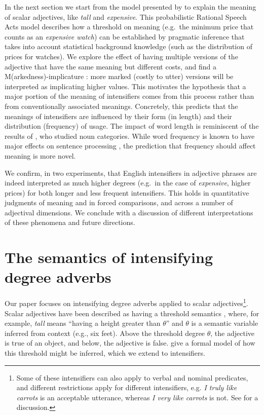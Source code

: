 \documentclass[10pt,letterpaper]{article}
\newcommand{\w}[1]{\emph{#1}}
\begin{document}
In the next section we start from the model presented by  to explain the meaning of scalar adjectives, like \emph{tall} and \emph{expensive}. This probabilistic Rational Speech Acts \cite{frank,goodman} model describes how a threshold on meaning (e.g.~the minimum price that counts as an \emph{expensive watch}) can be established by pragmatic inference that takes into account statistical background knowledge (such as the distribution of prices for watches). We explore the effect of having multiple versions of the adjective that have the same meaning but different costs, and find a M(arkedness)-implicature \cite{levinson}: more marked (costly to utter) versions will be interpreted as implicating higher values.
This motivates the hypothesis that a major portion of the meaning of intensifiers comes from this process rather than from conventionally associated meanings. Concretely, this predicts that the meanings of intensifiers are influenced by their form (in length) and their distribution (frequency) of usage. The impact of word length is reminiscent of the results of , who studied noun categories. While word frequency is known to have major effects on sentence processing \cite[e.g.]{levy}, the prediction that frequency should affect meaning is more novel.

We confirm, in two experiments, that English intensifiers in adjective phrases are indeed interpreted as much higher degrees (e.g.~in the case of \w{expensive}, higher prices) for both longer and less frequent intensifiers. This holds in quantitative judgments of meaning and in forced comparisons, and across a number of adjectival dimensions. We conclude with a discussion of different interpretations of these phenomena and future directions.

\section{The semantics of intensifying degree adverbs}

Our paper focuses on intensifying degree adverbs applied to scalar adjectives\footnote{Some of these intensifiers can also apply to verbal and nominal predicates, and different restrictions apply for different intensifiers, e.g. \w{I truly like carrots} is an acceptable utterance, whereas \w{I very like carrots} is not. See  for a discussion.}. Scalar adjectives have been described as having a threshold semantics \cite{kennedy}, where, for example, \w{tall} means ``having a height greater than $\theta$'' and $\theta$ is a semantic variable inferred from context (e.g., six feet). Above the threshold degree $\theta$, the adjective is true of an object, and below, the adjective is false.
 give a formal model of how this threshold might be inferred, which we extend to intensifiers.
\end{document}
